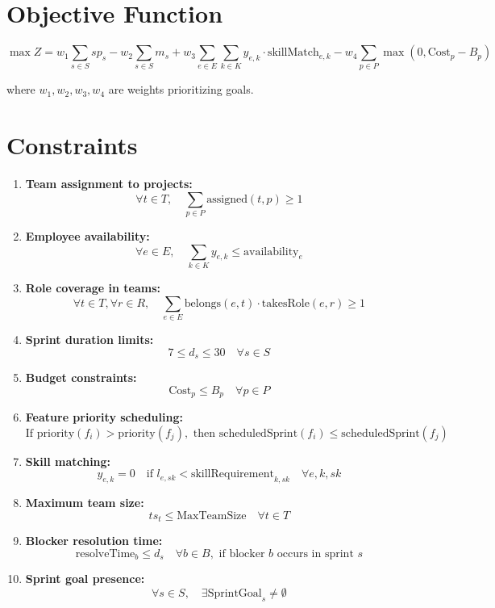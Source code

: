 \documentclass{article}
\begin{document}
\section*{Objective Function}
\[
\max Z = w_1 \sum_{s \in S} sp_s - w_2 \sum_{s \in S} m_s + w_3 \sum_{e \in E} \sum_{k \in K} y_{e,k} \cdot \text{skillMatch}_{e,k} - w_4 \sum_{p \in P} \max(0, \text{Cost}_p - B_p)
\]

where \( w_1, w_2, w_3, w_4 \) are weights prioritizing goals.

\section*{Constraints}

\begin{enumerate}
\item \textbf{Team assignment to projects:} \\
\[
\forall t \in T, \quad \sum_{p \in P} \text{assigned}(t,p) \geq 1
\]

\item \textbf{Employee availability:} \\
\[
\forall e \in E, \quad \sum_{k \in K} y_{e,k} \leq \text{availability}_e
\]

\item \textbf{Role coverage in teams:} \\
\[
\forall t \in T, \forall r \in R, \quad \sum_{e \in E} \text{belongs}(e,t) \cdot \text{takesRole}(e,r) \geq 1
\]

\item \textbf{Sprint duration limits:} \\
\[
7 \leq d_s \leq 30 \quad \forall s \in S
\]

\item \textbf{Budget constraints:} \\
\[
\text{Cost}_p \leq B_p \quad \forall p \in P
\]

\item \textbf{Feature priority scheduling:} \\
\[
\text{If } \text{priority}(f_i) > \text{priority}(f_j), \text{ then } \text{scheduledSprint}(f_i) \leq \text{scheduledSprint}(f_j)
\]

\item \textbf{Skill matching:} \\
\[
y_{e,k} = 0 \quad \text{if } l_{e,sk} < \text{skillRequirement}_{k,sk} \quad \forall e,k,sk
\]

\item \textbf{Maximum team size:} \\
\[
ts_t \leq \text{MaxTeamSize} \quad \forall t \in T
\]

\item \textbf{Blocker resolution time:} \\
\[
\text{resolveTime}_b \leq d_s \quad \forall b \in B, \text{ if blocker } b \text{ occurs in sprint } s
\]

\item \textbf{Sprint goal presence:} \\
\[
\forall s \in S, \quad \exists \text{SprintGoal}_s \neq \emptyset
\]

\end{enumerate}
\end{document}
